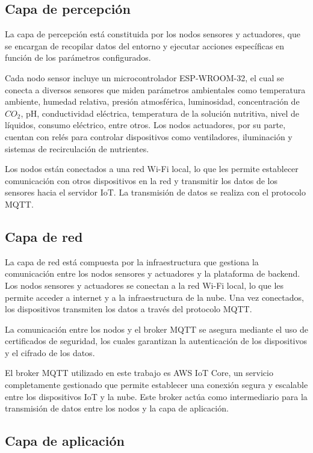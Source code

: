 \subsection{Capa de percepción}

La capa de percepción está constituida por los nodos sensores y actuadores, que
se encargan de recopilar datos del entorno y ejecutar acciones específicas en
función de los parámetros configurados.

Cada nodo sensor incluye un microcontrolador ESP-WROOM-32, el cual se conecta a
diversos sensores que miden parámetros ambientales como temperatura ambiente,
humedad relativa, presión atmosférica, luminosidad, concentración de $CO_2$,
pH, conductividad eléctrica, temperatura de la solución nutritiva, nivel de
líquidos, consumo eléctrico, entre otros. Los nodos actuadores, por su parte,
cuentan con relés para controlar dispositivos como ventiladores, iluminación y
sistemas de recirculación de nutrientes.

Los nodos están conectados a una red Wi-Fi local, lo que les permite establecer
comunicación con otros dispositivos en la red y transmitir los datos de los
sensores hacia el servidor IoT. La transmisión de datos se realiza con el
protocolo MQTT.

\subsection{Capa de red}

La capa de red está compuesta por la infraestructura que gestiona la
comunicación entre los nodos sensores y actuadores y la plataforma de backend.
Los nodos sensores y actuadores se conectan a la red Wi-Fi local, lo que les
permite acceder a internet y a la infraestructura de la nube. Una vez
conectados, los dispositivos transmiten los datos a través del protocolo MQTT.

La comunicación entre los nodos y el broker MQTT se asegura mediante el uso de
certificados de seguridad, los cuales garantizan la autenticación de los
dispositivos y el cifrado de los datos.

El broker MQTT utilizado en este trabajo es AWS IoT Core, un servicio
completamente gestionado que permite establecer una conexión segura y escalable
entre los dispositivos IoT y la nube. Este broker actúa como intermediario para
la transmisión de datos entre los nodos y la capa de aplicación.

\subsection{Capa de aplicación}

